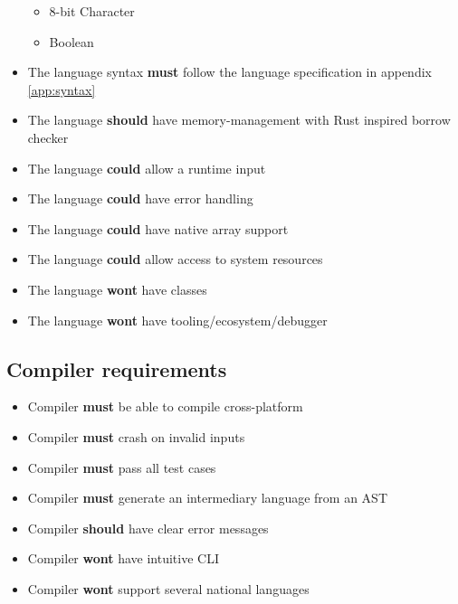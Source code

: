 \begin{itemize}
\begin{itemize}
\item 8-bit Character
\item Boolean
\end{itemize}
\item The language syntax \textbf{must} follow the language specification in appendix \ref{app:syntax}
\item The language \textbf{should} have memory-management with Rust inspired borrow checker
\item The language \textbf{could} allow a runtime input
\item The language \textbf{could} have error handling
\item The language \textbf{could} have native array support
\item The language \textbf{could} allow access to system resources
\item The language \textbf{wont} have classes
\item The language \textbf{wont} have tooling/ecosystem/debugger
\end{itemize}

\subsection{Compiler requirements} %

\begin{itemize}
\item Compiler \textbf{must} be able to compile cross-platform
\item Compiler \textbf{must} crash on invalid inputs
\item Compiler \textbf{must} pass all test cases
\item Compiler \textbf{must} generate an intermediary language from an AST
\item Compiler \textbf{should} have clear error messages
\item Compiler \textbf{wont} have intuitive CLI
\item Compiler \textbf{wont} support several national languages
\end{itemize}

\newpage
